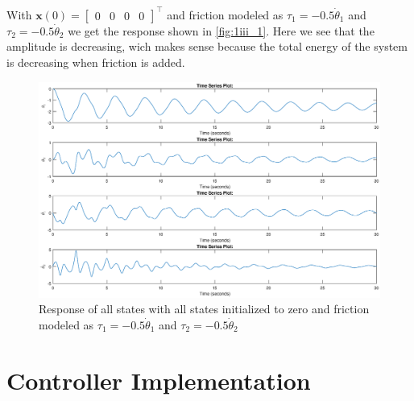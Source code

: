 \documentclass[a4paper]{scrartcl}
\begin{document}
\subsection{}
With $\bm{x}(0) = \begin{bmatrix}0 & 0 & 0 & 0\end{bmatrix}^\top$ and friction modeled as $\tau_1 = -0.5\dot{\theta}_1$ and $\tau_2 = -0.5\dot{\theta}_2$ we get the response shown in \autoref{fig:1iii_1}. Here we see that the amplitude is decreasing, wich makes sense because the total energy of the system is decreasing when friction is added.

\begin{figure}[ht!]
	\centering
	\includegraphics[width=.90\textwidth]{fig/1iii_1.eps}
	\caption{Response of all states with  all states initialized to zero and friction modeled as  $\tau_1 = -0.5\dot{\theta}_1$ and $\tau_2 = -0.5\dot{\theta}_2$ }
	\label{fig:1iii_1}
\end{figure}

\section{Controller Implementation}\label{sec:controller}
\end{document}
